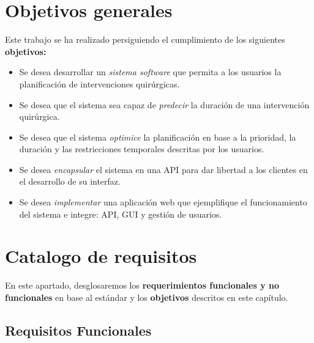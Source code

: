 \section{Objetivos generales}

Este trabajo se ha realizado persiguiendo el cumplimiento de los siguientes \textbf{objetivos:}

\begin{itemize}
    \item Se desea desarrollar un \textit{sistema software} que permita a los usuarios la planificación de intervenciones quirúrgicas.
    \item Se desea que el sistema sea capaz de \textit{predecir} la duración de una intervención quirúrgica.
    \item Se desea que el sistema \textit{optimice} la planificación en base a la prioridad, la duración y las restricciones temporales descritas por los usuarios.
    \item Se desea \textit{encapsular} el sistema en una API para dar libertad a los clientes en el desarrollo de su interfaz.
    \item Se desea \textit{implementar} una aplicación web que ejemplifique el funcionamiento del sistema e integre: API, GUI y gestión de usuarios.
\end{itemize}


\section{Catalogo de requisitos}

En este apartado, desglosaremos los \textbf{requerimientos funcionales y no funcionales} en base al estándar\cite{1998IEEESpecifications} y los \textbf{objetivos} descritos en este capítulo.

\subsection{Requisitos Funcionales}

